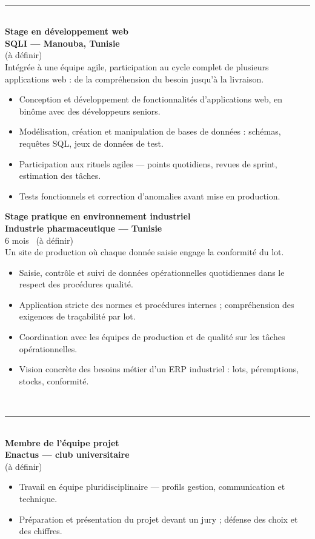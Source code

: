 \documentclass[a4paper,9pt]{extarticle}
\newcommand{\cvsection}[1]{%
  \vspace{2.2mm}%
  {\bfseries\scriptsize\color{accent}\textls[160]{#1}}\\[1.1mm]
  {\color{line}\rule{\linewidth}{0.5pt}}\\[1.2mm]}
\newcommand{\cventry}[3]{%
  {\color{ink}\bfseries\normalsize #1}\\[0.4mm]
  {\color{accent}\bfseries\small #2}\\[0.3mm]
  {\scriptsize\color{muted}#3}\\[0.8mm]}
\newenvironment{cvlist}
  {\begin{itemize}[leftmargin=3.4mm,labelsep=1.6mm,itemsep=0.45mm,topsep=0.6mm,
                   parsep=0pt,label={\color{brass}\textendash}]\footnotesize}
  {\end{itemize}\vspace{1.2mm}}
\begin{document}
\begin{minipage}[t]{0.575\textwidth}

\cvsection{EXPÉRIENCE}

\cventry{Stage en développement web}{SQLI --- Manouba, Tunisie}{(à définir)}
\footnotesize Intégrée à une équipe agile, participation au cycle complet de plusieurs applications web :
de la compréhension du besoin jusqu'à la livraison.
\begin{cvlist}
  \item Conception et développement de fonctionnalités d'applications web, en binôme avec des
        développeurs seniors.
  \item Modélisation, création et manipulation de bases de données : schémas, requêtes SQL,
        jeux de données de test.
  \item Participation aux rituels agiles --- points quotidiens, revues de sprint, estimation
        des tâches.
  \item Tests fonctionnels et correction d'anomalies avant mise en production.
\end{cvlist}

\cventry{Stage pratique en environnement industriel}{Industrie pharmaceutique --- Tunisie}{6 mois \textperiodcentered\ (à définir)}
\footnotesize Un site de production où chaque donnée saisie engage la conformité du lot.
\begin{cvlist}
  \item Saisie, contrôle et suivi de données opérationnelles quotidiennes dans le respect des
        procédures qualité.
  \item Application stricte des normes et procédures internes ; compréhension des exigences de
        traçabilité par lot.
  \item Coordination avec les équipes de production et de qualité sur les tâches opérationnelles.
  \item Vision concrète des besoins métier d'un ERP industriel : lots, péremptions, stocks,
        conformité.
\end{cvlist}

\cvsection{ENGAGEMENT ASSOCIATIF}

\cventry{Membre de l'équipe projet}{Enactus --- club universitaire}{(à définir)}
\begin{cvlist}
  \item Travail en équipe pluridisciplinaire --- profils gestion, communication et technique.
  \item Préparation et présentation du projet devant un jury ; défense des choix et des chiffres.
\end{cvlist}


\end{minipage}
\end{document}
